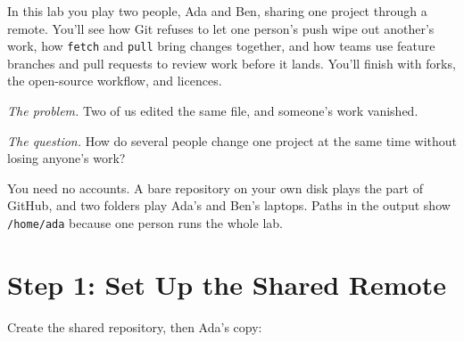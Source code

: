 
\begin{chapterintro}

In this lab you play two people, Ada and Ben, sharing one project through a remote. You'll see how Git refuses to let one person's push wipe out another's work, how \texttt{fetch} and \texttt{pull} bring changes together, and how teams use feature branches and pull requests to review work before it lands. You'll finish with forks, the open-source workflow, and licences.

\end{chapterintro}

\emph{The problem.} Two of us edited the same file, and someone's work vanished.

\emph{The question.} How do several people change one project at the same time without losing anyone's work?

You need no accounts. A bare repository on your own disk plays the part of GitHub, and two folders play Ada's and Ben's laptops. Paths in the output show \texttt{/home/ada} because one person runs the whole lab.


\section{Step 1: Set Up the Shared Remote}\label{11-lab-work-on-a-project-with-someone-else:step-1-set-up-the-shared-remote}

Create the shared repository, then Ada's copy:

\begin{codeblock}

\begin{Shaded}
\begin{Highlighting}[]
 \KeywordTok{\&\&} 
\end{Highlighting}
\end{Shaded}

\end{codeblock}

